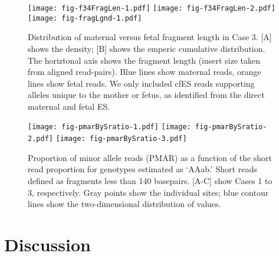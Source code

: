 \documentclass{article}\usepackage[]{graphicx}\usepackage[]{color}
\begin{document}
\begin{figure}
  \centering
  \texttt{[image: fig-f34FragLen-1.pdf]}%
  \texttt{[image: fig-f34FragLen-2.pdf]}
  \texttt{[image: fig-fragLgnd-1.pdf]}
  \caption{Distribution of maternal versus fetal fragment length in Case 3. [A] shows the density; [B] shows the emperic cumulative distribution. The horiztonal axis shows the fragment length (insert size taken from aligned read-pairs). Blue lines show maternal reads, orange lines show fetal reads. We only included cfES reads supporting alleles unique to the mother or fetus, as identified from the direct maternal and fetal ES.}
  \label{fig:c3fragLen}
\end{figure}

\begin{figure}
  \centering
  \texttt{[image: fig-pmarBySratio-1.pdf]}%
  \texttt{[image: fig-pmarBySratio-2.pdf]}%
  \texttt{[image: fig-pmarBySratio-3.pdf]}
  \caption{Proportion of minor allele reads (PMAR) as a function of the short read proportion for genotypes estimated as `AAab.' Short reads defined as fragments less than 140 basepairs. [A-C] show Cases 1 to 3, respectively. Gray points show the individual sites; blue contour lines show the two-dimensional distribution of values.}
  \label{fig:pmarBySratio}
\end{figure}

\section{Discussion}

\end{document}
